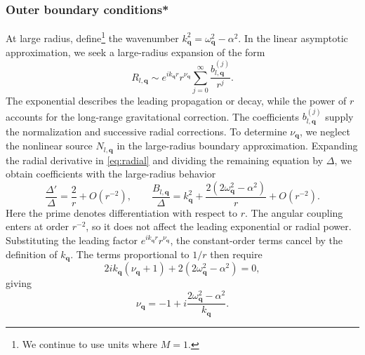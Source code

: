\documentclass[11pt]{article}
\begin{document}
\subsubsection{Outer boundary conditions*}
At large radius, define\footnote{We continue to use units where $M=1$.} the wavenumber $k_\mathbf{q}^2 = \omega_\mathbf{q}^2 - \alpha^2$. In the linear asymptotic approximation, we seek a large-radius
expansion of the form
\begin{equation}
    \label{eq:outer_series}
    R_{l,\mathbf q}
    \sim e^{ik_{\mathbf q}r}r^{\nu_{\mathbf q}}
    \sum_{j=0}^{\infty}\frac{b^{(j)}_{l,\mathbf q}}{r^j}.
\end{equation}
The exponential describes the leading propagation or decay, while the power of $r$ accounts for the long-range gravitational correction. The coefficients $b^{(j)}_{l,\mathbf q}$ supply the normalization and successive radial corrections. To determine $\nu_{\mathbf q}$, we neglect the nonlinear source $N_{l,\mathbf q}$ in the large-radius boundary approximation. Expanding the radial derivative in \eqref{eq:radial} and dividing the remaining equation by $\Delta$, we obtain coefficients with the large-radius behavior
\begin{equation}
    \frac{\Delta'}{\Delta}=\frac{2}{r}+O(r^{-2}),
    \qquad
    \frac{B_{l,\mathbf q}}{\Delta}=k_{\mathbf q}^2+\frac{2(2\omega_{\mathbf q}^2-\alpha^2)}{r}+O(r^{-2}).
\end{equation}
Here the prime denotes differentiation with respect to $r$. The angular coupling enters at order $r^{-2}$, so it does not affect the leading exponential or radial power. Substituting the leading factor $e^{ik_{\mathbf q}r}r^{\nu_{\mathbf q}}$, the constant-order terms cancel by the definition of $k_{\mathbf q}$. The terms proportional to $1/r$ then require
\begin{equation}
    2ik_{\mathbf q}(\nu_{\mathbf q}+1)+2(2\omega_{\mathbf q}^2-\alpha^2)=0,
\end{equation}
giving
\begin{equation}
    \label{eq:outer_exponent}
    \nu_{\mathbf q}=-1+i\frac{2\omega_{\mathbf q}^2-\alpha^2}{k_{\mathbf q}}.
\end{equation}
\end{document}
